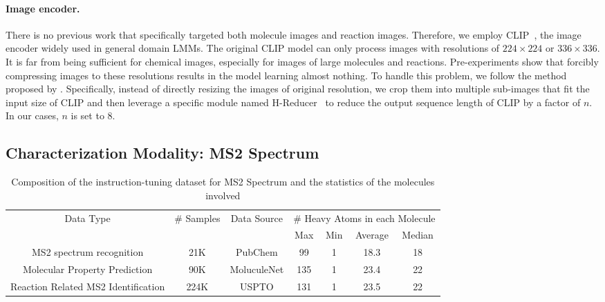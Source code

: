 \paragraph{Image encoder.} There is no previous work that specifically targeted both molecule images and reaction images. Therefore, we employ CLIP~\cite{radford2021learning}, the image encoder widely used in general domain LMMs. The original CLIP model can only process images with resolutions of $224\times224$ or $336\times336$. It is far from being sufficient for chemical images, especially for images of large molecules and reactions. Pre-experiments show that forcibly compressing images to these resolutions results in the model learning almost nothing. To handle this problem, we follow the method proposed by \cite{llava}. Specifically, instead of directly resizing the images of original resolution, we crop them into multiple sub-images that fit the input size of CLIP and then leverage a specific module named H-Reducer~\cite{hu2024mplug} to reduce the output sequence length of CLIP by a factor of $n$. In our cases, $n$ is set to $8$.

\subsection{Characterization Modality: MS2 Spectrum}\label{sec:ms}

\begin{table}[t]
    \centering
    \begin{tabular}{ccccccc}
    \toprule
        \multirow{2}{*}{Data Type} & \multirow{2}{*}{\# Samples} & \multirow{2}{*}{Data Source} & \multicolumn{4}{c}{\# Heavy Atoms in each Molecule} \\
        & & & Max & Min & Average & Median \\
    \midrule
        MS2 spectrum recognition & 21K & PubChem & 99 & 1 & 18.3 & 18\\
        Molecular Property Prediction & 90K & MoluculeNet & 135 & 1 & 23.4 & 22 \\
        Reaction Related MS2 Identification &  224K & USPTO & 131 & 1 & 23.5 & 22\\
    \bottomrule
    \end{tabular}
    \caption{Composition of the instruction-tuning dataset for MS2 Spectrum and the statistics of the molecules involved}
    \label{tab:datams}
\end{table}

